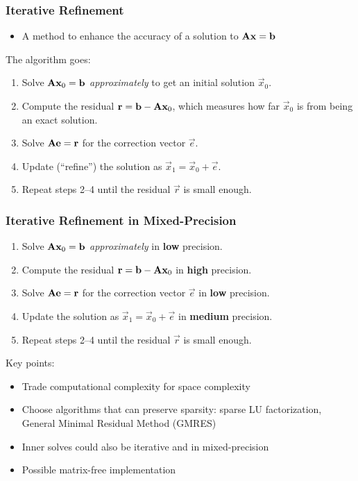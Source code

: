 \documentclass[t,12pt,numbers,fleqn]{beamer}
\begin{document}

\begin{frame}
\frametitle{Iterative Refinement}

\begin{itemize}
\item A method to enhance the accuracy of a solution to \(\mathbf{A}\mathbf{x} = \mathbf{b}\)
\end{itemize}

The algorithm goes:
\begin{enumerate}
\item Solve \(\mathbf{A}\mathbf{x}_0 = \mathbf{b}\) \emph{approximately} to get an initial solution \(\vec{x}_0\).
\item Compute the residual \(\mathbf{r} = \mathbf{b} - \mathbf{A}\mathbf{x}_0\), which measures how far \(\vec{x}_0\) is
  from being an exact solution.
\item Solve \(\mathbf{A}\mathbf{e} = \mathbf{r}\) for the correction vector \(\vec{e}\).
\item Update (``refine'') the solution as \(\vec{x}_1 = \vec{x}_0 + \vec{e}\).
\item Repeat steps 2--4 until the residual \(\vec{r}\) is small enough.
\end{enumerate}

\end{frame}


\begin{frame}
\frametitle{Iterative Refinement in Mixed-Precision}

\begin{enumerate}
\item Solve \(\mathbf{A}\mathbf{x}_0 = \mathbf{b}\) \emph{approximately} in \textbf{low} precision.
\item Compute the residual \(\mathbf{r} = \mathbf{b} - \mathbf{A}\mathbf{x}_0\) in \textbf{high} precision.
\item Solve \(\mathbf{A}\mathbf{e} = \mathbf{r}\) for the correction vector \(\vec{e}\) in \textbf{low} precision.
\item Update the solution as \(\vec{x}_1 = \vec{x}_0 + \vec{e}\) in \textbf{medium} precision.
\item Repeat steps 2--4 until the residual \(\vec{r}\) is small enough.
\end{enumerate}

Key points:

\begin{itemize}
\item Trade computational complexity for space complexity
\item Choose algorithms that can preserve sparsity: sparse LU factorization,
  General Minimal Residual Method (GMRES)
\item Inner solves could also be iterative and in mixed-precision
\item Possible matrix-free implementation
\end{itemize}

\end{frame}
\end{document}
